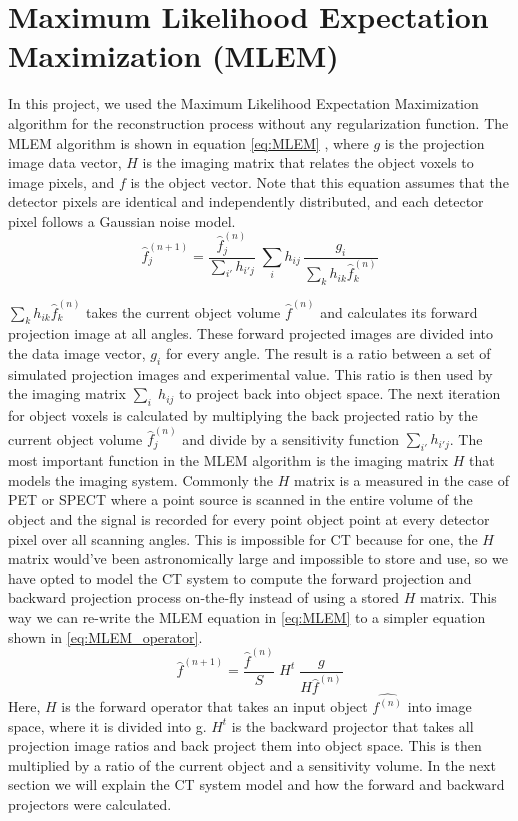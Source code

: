 \section{Maximum Likelihood Expectation Maximization (MLEM) }
In this project, we used the Maximum Likelihood Expectation Maximization algorithm for the reconstruction process without any regularization function.  The MLEM algorithm is shown in equation \ref{eq:MLEM} \citep{EmissionTom2004}, where $g$ is the projection image data vector, $H$ is the imaging matrix that relates the object voxels to image pixels, and $f$ is the object vector.  Note that this equation assumes that the detector pixels are identical and independently distributed, and each detector pixel follows a Gaussian noise model. 
\begin{equation}
\hat{f}^{(n+1)}_{j} = \frac{\hat{f}^{(n)}_j}{{\sum\limits_{i'}} h_{i'j}} \; 
						\sum\limits_{i} h_{ij} \, \frac{g_{i}}{\sum\limits_{k} h_{ik} \hat{f}_{k}^{(n)}}
\label{eq:MLEM}
\end{equation}

$\sum\limits_k h_{ik} \hat{f}_k^{(n)}$ takes the current object volume $\hat{f}^{(n)}$ and calculates its forward projection image at all angles.  These forward projected images are divided into the data image vector, $g_i$ for every angle.  The result is a ratio between a set of simulated projection images and experimental value.  This ratio is then used by the imaging matrix $\sum\limits_i \; h_{ij}$ to project back into object space.  The next iteration for object voxels is calculated by multiplying the back projected ratio by the current object volume $\hat{f}_j^{(n)}$ and divide by a sensitivity function $\sum\limits_{i'} h_{i'j}$.
The most important function in the MLEM algorithm is the imaging matrix $H$ that models the imaging system.  Commonly the $H$ matrix is a measured in the case of PET or SPECT where a point source is scanned in the entire volume of the object and the signal is recorded for every point object point at every detector pixel over all scanning angles.  This is impossible for CT because for one, the $H$ matrix would've been astronomically large and impossible to store and use, so we have opted to model the CT system to compute the forward projection and backward projection process on-the-fly instead of using a stored $H$ matrix.  This way we can re-write the MLEM equation in \ref{eq:MLEM} to a simpler equation shown in \ref{eq:MLEM_operator}.
\begin{equation}
\hat{f}^{(n+1)} = \frac{\hat{f}^{(n)}}{S} \; H^{t} \; \frac{g}{H \hat{f}^{(n)}}
\label{eq:MLEM_operator}
\end{equation}
Here, $H$ is the forward operator that takes an input object $\hat{f^{(n)}}$ into image space, where it is divided into g.  $H^t$ is the backward projector that takes all projection image ratios and back project them into object space.  This is then multiplied by a ratio of the current object and a sensitivity volume.  In the next section we will explain the CT system model and how the forward and backward projectors were calculated.

